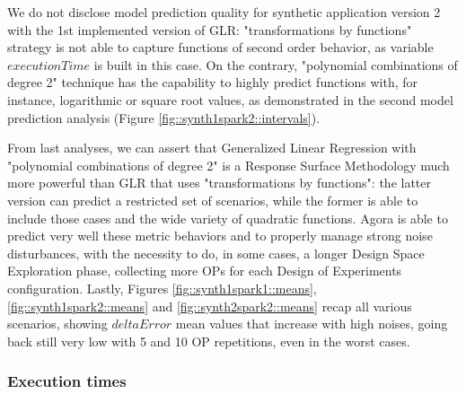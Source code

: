 We do not disclose model prediction quality for synthetic application version 2 with the 1st implemented version of GLR: "transformations by functions" strategy is not able to capture functions of second order behavior, as variable $executionTime$ is built in this case. On the contrary, "polynomial combinations of degree 2" technique has the capability to highly predict functions with, for instance, logarithmic or square root values, as demonstrated in the second model prediction analysis (Figure \ref{fig::synth1spark2::intervals}).

From last analyses, we can assert that Generalized Linear Regression with "polynomial combinations of degree 2" is a Response Surface Methodology much more powerful than GLR that uses "transformations by functions": the latter version can predict a restricted set of scenarios, while the former is able to include those cases and the wide variety of quadratic functions. Agora is able to predict very well these metric behaviors and to properly manage strong noise disturbances, with the necessity to do, in some cases, a longer Design Space Exploration phase, collecting more OPs for each Design of Experiments configuration. Lastly, Figures \ref{fig::synth1spark1::means}, \ref{fig::synth1spark2::means} and \ref{fig::synth2spark2::means} recap all various scenarios, showing $deltaError$ mean values that increase with high noises, going back still very low with 5 and 10 OP repetitions, even in the worst cases.


\subsubsection{Execution times}

